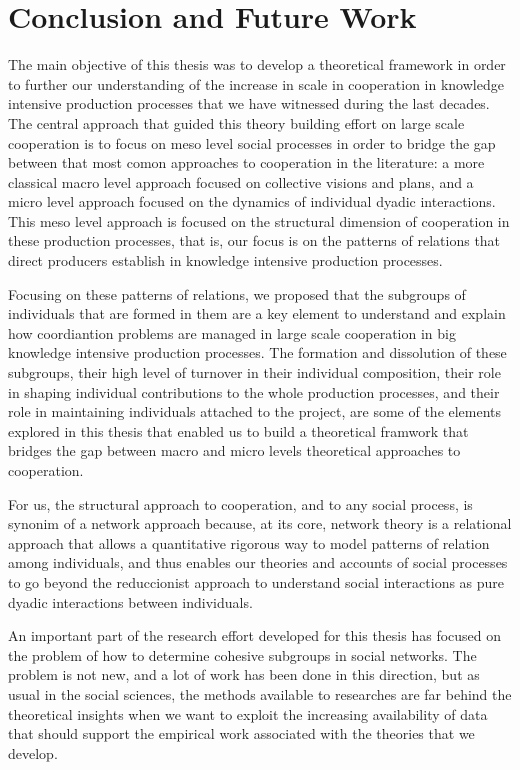 \chapter{Conclusion and Future Work}
\label{conclusion}

The main objective of this thesis was to develop a theoretical framework in order to further our understanding of the increase in scale in cooperation in knowledge intensive production processes that we have witnessed during the last decades. The central approach that guided this theory building effort on large scale cooperation is to focus on meso level social processes in order to bridge the gap between that most comon approaches to cooperation in the literature: a more classical macro level approach focused on collective visions and plans, and a micro level approach focused on the dynamics of individual dyadic interactions. This meso level approach is focused on the structural dimension of cooperation in these production processes, that is, our focus is on the patterns of relations that direct producers establish in knowledge intensive production processes.

Focusing on these patterns of relations, we proposed that the subgroups of individuals that are formed in them are a key element to understand and explain how coordiantion problems are managed in large scale cooperation in big knowledge intensive production processes. The formation and dissolution of these subgroups, their high level of turnover in their individual composition, their role in shaping individual contributions to the whole production processes, and their role in maintaining individuals attached to the project, are some of the elements explored in this thesis that enabled us to build a theoretical framwork that bridges the gap between macro and micro levels theoretical approaches to cooperation.

For us, the structural approach to cooperation, and to any social process, is synonim of a network approach because, at its core, network theory is a relational approach that allows a quantitative rigorous way to model patterns of relation among individuals, and thus enables our theories and accounts of social processes to go beyond the reduccionist approach to understand social interactions as pure dyadic interactions between individuals.

An important part of the research effort developed for this thesis has focused on the problem of how to determine cohesive subgroups in social networks. The problem is not new, and a lot of work has been done in this direction, but as usual in the social sciences, the methods available to researches are far behind the theoretical insights when we want to exploit the increasing availability of data that should support the empirical work associated with the theories that we develop.

